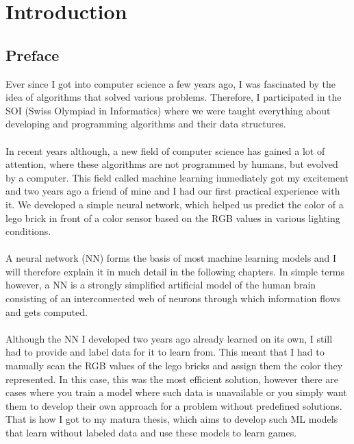 \documentclass[12pt]{report}
\begin{document}
    \setcounter{page}{5}
    \tableofcontents

    \chapter{Introduction}\label{ch:introduction}


    \section{Preface}\label{sec:preface}
    Ever since I got into computer science a few years ago, I was fascinated by the idea of algorithms that solved various problems.
    Therefore, I participated in the SOI (Swiss Olympiad in Informatics) where we were taught everything about developing and programming algorithms and their data structures.
    \\ \\
    In recent years although, a new field of computer science has gained a lot of attention, where these algorithms are not programmed by humans, but evolved by a computer.
    This field called machine learning immediately got my excitement and two years ago a friend of mine and I had our first practical experience with it.
    We developed a simple neural network, which helped us predict the color of a lego brick in front of a color sensor based on the RGB values in various lighting conditions.
    \\ \\
    A neural network (NN) forms the basis of most machine learning models and I will therefore explain it in much detail in the following chapters.
    In simple terms however, a NN is a strongly simplified artificial model of the human brain consisting of an interconnected web of neurons through which information flows and gets computed.
    \\ \\
    Although the NN I developed two years ago already learned on its own, I still had to provide and label data for it to learn from.
    This meant that I had to manually scan the RGB values of the lego bricks and assign them the color they represented.
    In this case, this was the most efficient solution, however there are cases where you train a model where such data is unavailable or you simply want them to develop their own approach for a problem without predefined solutions.
    That is how I got to my matura thesis, which aims to develop such ML models that learn without labeled data and use these models to learn games.
\end{document}
